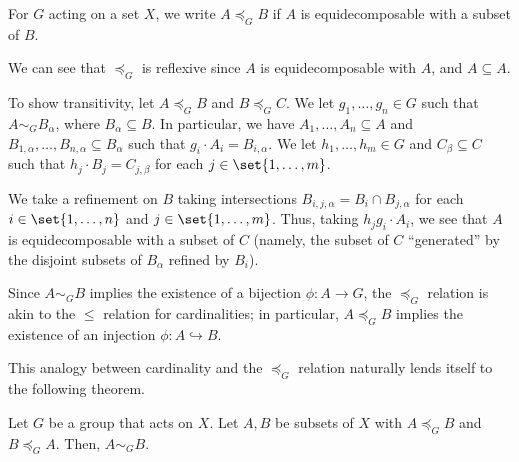\documentclass[12pt]{mypackage}
\begin{document}
\begin{definition}
  For $G$ acting on a set $X$, we write $A\preceq_{G}B$ if $A$ is equidecomposable with a subset of $B$.
\end{definition}
\begin{remark}
  We can see that $\preceq_{G}$ is reflexive since $A$ is equidecomposable with $A$, and $A\subseteq A$.\newline

  To show transitivity, let $A\preceq_{G} B$ and $B\preceq_{G} C$. We let $g_1,\dots,g_n\in G$ such that $A\sim_{G}B_{\alpha}$, where $B_{\alpha}\subseteq B$. In particular, we have $A_1,\dots,A_n\subseteq A$ and $B_{1,\alpha},\dots,B_{n,\alpha}\subseteq B_{\alpha}$ such that $g_i\cdot A_i = B_{i,\alpha}$. We let $h_1,\dots,h_m\in G$ and $C_{\beta}\subseteq C$ such that $h_j\cdot B_j = C_{j,\beta}$ for each $j\in \set{1,\dots,m}$.\newline

  We take a refinement on $B$ taking intersections $B_{i,j,\alpha} = B_i \cap B_{j,\alpha}$ for each $i\in \set{1,\dots,n}$ and $j\in \set{1,\dots,m}$. Thus, taking $h_jg_i\cdot A_i$, we see that $A$ is equidecomposable with a subset of $C$ (namely, the subset of $C$ ``generated'' by the disjoint subsets of $B_{\alpha}$ refined by $B_i$).
\end{remark}
\begin{remark}
  Since $A\sim_{G} B$ implies the existence of a bijection $\phi: A\rightarrow G$, the $\preceq_{G}$ relation is akin to the $\leq$ relation for cardinalities; in particular, $A\preceq_{G}B$ implies the existence of an injection $\phi: A\hookrightarrow B$.\newline

  This analogy between cardinality and the $\preceq_{G}$ relation naturally lends itself to the following theorem.
\end{remark}
\begin{theorem}
  Let $G$ be a group that acts on $X$. Let $A,B$ be subsets of $X$ with $A\preceq_{G} B$ and $B\preceq_{G} A$. Then, $A\sim_{G} B$.
\end{theorem}
\end{document}
